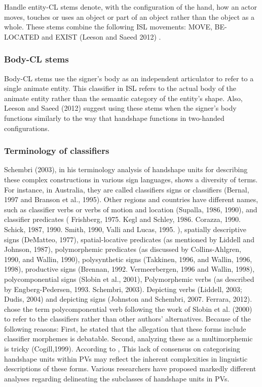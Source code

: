 Handle entity-CL stems denote, with the configuration of the hand, how an actor 
moves, touches or uses an object or part of an object rather than the object as a 
whole. These stems combine the following ISL movements: MOVE, BE-LOCATED and EXIST 
(Leeson and Saeed 2012) \cite{leeson2012}.

\subsubsection{Body-CL stems}

Body-CL stems use the signer's body as an independent articulator to refer to a 
single animate entity. This classifier in ISL refers to the actual body of the 
animate entity rather than the semantic category of the entity's shape. Also, Leeson 
and Saeed (2012) \cite{leeson2012} suggest using these stems when the signer's body functions similarly 
to the way that handshape functions in two-handed configurations.



\subsubsection{Terminology of classifiers}

Schembri (2003), in his terminology analysis of handshape units for describing these 
complex constructions in various sign languages, shows a diversity of terms. For 
instance, in  Australia, they are called classifiers signs or classifiers (Bernal, 
1997 and Branson et al., 1995). Other regions and countries have different names, 
such as classifier verbs or verbs of motion and location (Supalla, 1986, 1990), 
and classifier predicates ( Frishberg, 1975. Kegl and Schley, 1986. Corazza, 1990. Schick, 1987, 1990. Smith, 1990, Valli 
and Lucas, 1995. ), spatially descriptive signs (DeMatteo, 1977), spatial-locative predicates (as mentioned by Liddell and 
Johnson, 1987), polymorphemic predicates (as discussed by Collins-Ahlgren, 1990, and Wallin, 
1990), polysynthetic signs (Takkinen, 1996, and Wallin, 1996, 1998), productive signs 
(Brennan, 1992. Vermeerbergen, 1996 and  Wallin, 1998), polycomponential signs (Slobin et al., 2001), Polymorphemic verbs 
(as described by Engberg-Pedersen, 1993. Schembri, 2003). Depicting verbs (Liddell, 2003; Dudis, 2004) and depicting signs 
(Johnston and Schembri, 2007. Ferrara, 2012).\\

\textcite{schembri2003} chose the term polycomponential verb following the work of Slobin et al. (2000) to refer to 
the classifiers rather than other authors' alternatives. Because of the following 
reasons: First, he stated that the allegation that these forms include classifier 
morphemes is debatable. Second, analyzing these as a multimorphemic is tricky 
(Cogill,1999).
According to \textcite{schembri2003}, This lack of consensus on categorising 
handshape units within PVs may reflect the inherent complexities in linguistic 
descriptions of these forms. Various researchers have proposed markedly different 
analyses regarding delineating the subclasses of handshape units in PVs. \\

